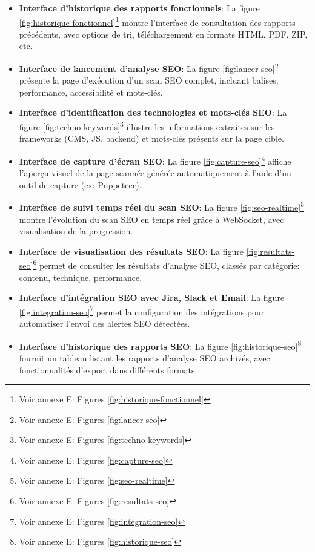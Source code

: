 \begin{itemize}[label=$\bullet$]
    \item \textbf{Interface d’historique des rapports fonctionnels}:
    La figure \ref{fig:historique-fonctionnel}\footnote{Voir annexe E: Figures \ref{fig:historique-fonctionnel}} montre l’interface de consultation des rapports précédents, avec options de tri, téléchargement en formats HTML, PDF, ZIP, etc.
    
    \item \textbf{Interface de lancement d’analyse SEO}:
    La figure \ref{fig:lancer-seo}\footnote{Voir annexe E: Figures \ref{fig:lancer-seo}} présente la page d'exécution d’un scan SEO complet, incluant balises, performance, accessibilité et mots-clés.
    
    \item \textbf{Interface d’identification des technologies et mots-clés SEO}:
    La figure \ref{fig:techno-keywords}\footnote{Voir annexe E: Figures \ref{fig:techno-keywords}} illustre les informations extraites sur les frameworks (CMS, JS, backend) et mots-clés présents sur la page cible.
    
    \item \textbf{Interface de capture d’écran SEO}:
    La figure \ref{fig:capture-seo}\footnote{Voir annexe E: Figures \ref{fig:capture-seo}} affiche l'aperçu visuel de la page scannée générée automatiquement à l’aide d’un outil de capture (ex: Puppeteer).
    
    \item \textbf{Interface de suivi temps réel du scan SEO}:
    La figure \ref{fig:seo-realtime}\footnote{Voir annexe E: Figures \ref{fig:seo-realtime}} montre l’évolution du scan SEO en temps réel grâce à WebSocket, avec visualisation de la progression.
    
    \item \textbf{Interface de visualisation des résultats SEO}:
    La figure \ref{fig:resultats-seo}\footnote{Voir annexe E: Figures \ref{fig:resultats-seo}} permet de consulter les résultats d’analyse SEO, classés par catégorie: contenu, technique, performance.
    
    \item \textbf{Interface d’intégration SEO avec Jira, Slack et Email}:
    La figure \ref{fig:integration-seo}\footnote{Voir annexe E: Figures \ref{fig:integration-seo}} permet la configuration des intégrations pour automatiser l’envoi des alertes SEO détectées.
    
    \item \textbf{Interface d’historique des rapports SEO}:
    La figure \ref{fig:historique-seo}\footnote{Voir annexe E: Figures \ref{fig:historique-seo}} fournit un tableau listant les rapports d’analyse SEO archivés, avec fonctionnalités d’export dans différents formats.
\end{itemize}




